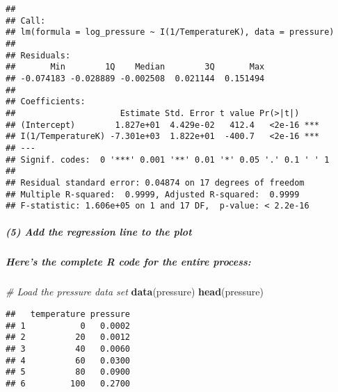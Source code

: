 \documentclass[
]{article}
\newenvironment{Shaded}{\begin{snugshade}}{\end{snugshade}}
\newcommand{\AttributeTok}[1]{\textcolor[rgb]{0.13,0.29,0.53}{#1}}
\newcommand{\CommentTok}[1]{\textcolor[rgb]{0.56,0.35,0.01}{\textit{#1}}}
\newcommand{\DecValTok}[1]{\textcolor[rgb]{0.00,0.00,0.81}{#1}}
\newcommand{\FunctionTok}[1]{\textcolor[rgb]{0.13,0.29,0.53}{\textbf{#1}}}
\newcommand{\NormalTok}[1]{#1}
\newcommand{\OtherTok}[1]{\textcolor[rgb]{0.56,0.35,0.01}{#1}}
\newcommand{\SpecialCharTok}[1]{\textcolor[rgb]{0.81,0.36,0.00}{\textbf{#1}}}
\newcommand{\StringTok}[1]{\textcolor[rgb]{0.31,0.60,0.02}{#1}}
\begin{document}
\begin{verbatim}
## 
## Call:
## lm(formula = log_pressure ~ I(1/TemperatureK), data = pressure)
## 
## Residuals:
##       Min        1Q    Median        3Q       Max 
## -0.074183 -0.028889 -0.002508  0.021144  0.151494 
## 
## Coefficients:
##                     Estimate Std. Error t value Pr(>|t|)    
## (Intercept)        1.827e+01  4.429e-02   412.4   <2e-16 ***
## I(1/TemperatureK) -7.301e+03  1.822e+01  -400.7   <2e-16 ***
## ---
## Signif. codes:  0 '***' 0.001 '**' 0.01 '*' 0.05 '.' 0.1 ' ' 1
## 
## Residual standard error: 0.04874 on 17 degrees of freedom
## Multiple R-squared:  0.9999, Adjusted R-squared:  0.9999 
## F-statistic: 1.606e+05 on 1 and 17 DF,  p-value: < 2.2e-16
\end{verbatim}

\subparagraph{(5) Add the regression line to the
plot}\label{add-the-regression-line-to-the-plot}

\subparagraph{Here's the complete R code for the entire
process:}\label{heres-the-complete-r-code-for-the-entire-process}

\begin{Shaded}
\begin{Highlighting}[]
\CommentTok{\# Load the pressure data set}
\FunctionTok{data}\NormalTok{(pressure)}
\FunctionTok{head}\NormalTok{(pressure)}
\end{Highlighting}
\end{Shaded}

\begin{verbatim}
##   temperature pressure
## 1           0   0.0002
## 2          20   0.0012
## 3          40   0.0060
## 4          60   0.0300
## 5          80   0.0900
## 6         100   0.2700
\end{verbatim}

\begin{Shaded}
\end{Shaded}
\end{document}
